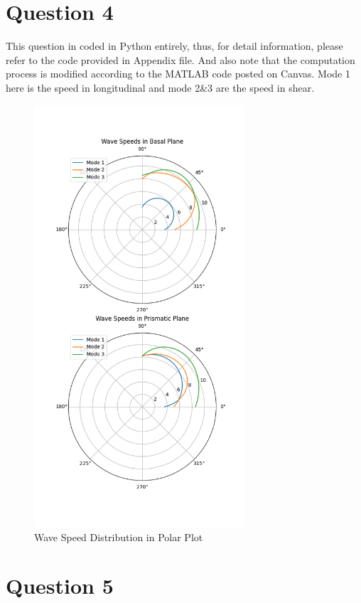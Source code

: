 \documentclass[12pt]{article} %
\begin{document}
\section{Question 4}
This question in coded in Python entirely, thus, for detail information, please refer to the code provided in Appendix file.
And also note that the computation process is modified according to the MATLAB code posted on Canvas. Mode 1 here is the speed in longitudinal and mode 2\&3 are the speed in shear.
\begin{figure}[ht]
    \centering
    \includegraphics[width=0.7\textwidth]{Q4.png}
    \caption{Wave Speed Distribution in Polar Plot}
\end{figure}

\clearpage
\section{Question 5}
\end{document}

